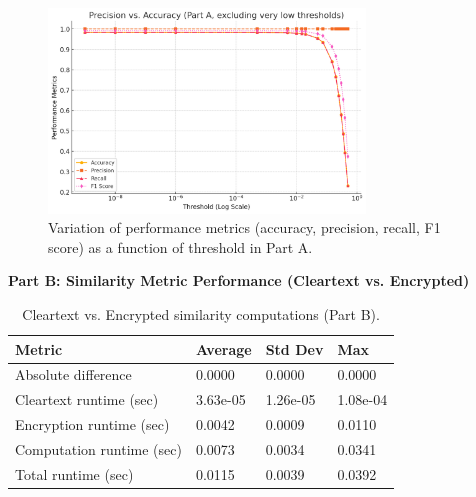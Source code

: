 \documentclass[12pt,a4paper]{article}
\begin{document}
\begin{figure}[H]
    \centering
    \includegraphics[width=0.75\textwidth]{./elements/Precision vs. Accuracy (Part A).png}
    \caption{Variation of performance metrics (accuracy, precision, recall, F1 score) 
    as a function of threshold in Part A.}
    \label{fig:precision_vs_accuracy}
\end{figure}

\bigskip
\noindent
\textbf{Part B: Similarity Metric Performance (Cleartext vs. Encrypted)}

\begin{table}[H]
\centering
\begin{tabular}{|l|l|l|l|}
\hline
\textbf{Metric}              & \textbf{Average} & \textbf{Std Dev} & \textbf{Max} \\ \hline
Absolute difference          & 0.0000           & 0.0000           & 0.0000       \\ \hline
Cleartext runtime (sec)      & 3.63e-05         & 1.26e-05         & 1.08e-04     \\ \hline
Encryption runtime (sec)     & 0.0042           & 0.0009           & 0.0110       \\ \hline
Computation runtime (sec)    & 0.0073           & 0.0034           & 0.0341       \\ \hline
Total runtime (sec)          & 0.0115           & 0.0039           & 0.0392       \\ \hline
\end{tabular}
\caption{Cleartext vs. Encrypted similarity computations (Part B).}
\label{tab:partB_sim}
\end{table}
\end{document}

